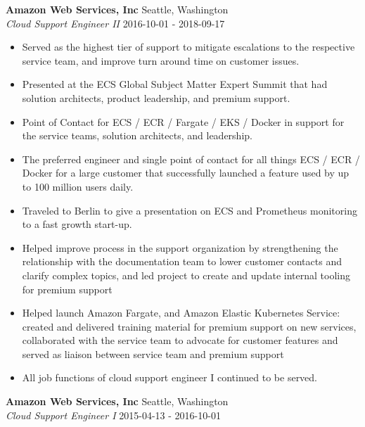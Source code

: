 \documentclass[a4paper]{article}
\begin{document}
\textbf{Amazon Web Services, Inc} \hfill Seattle, Washington\\
\textit{Cloud Support Engineer II} \hfill 2016-10-01 - 2018-09-17\\
\vspace{-1mm}
\begin{itemize} \itemsep 1pt
    \item Served as the highest tier of support to mitigate escalations to the respective service team, and improve turn around time on customer issues.
    \item Presented at the ECS Global Subject Matter Expert Summit that had solution architects, product leadership, and premium support.
    \item Point of Contact for ECS / ECR / Fargate / EKS / Docker in support for the service teams, solution architects, and leadership.
    \item The preferred engineer and single point of contact for all things ECS / ECR / Docker for a large customer that successfully launched a feature used by up to 100 million users daily.
    \item Traveled to Berlin to give a presentation on ECS and Prometheus monitoring to a fast growth start-up.
    \item Helped improve process in the support organization by strengthening the relationship with the documentation team to lower customer contacts and clarify complex topics, and led project to create and update internal tooling for premium support
    \item Helped launch Amazon Fargate, and Amazon Elastic Kubernetes Service: created and delivered training material for premium support on new services, collaborated with the service team to advocate for customer features and served as liaison between service team and premium support
    \item All job functions of cloud support engineer I continued to be served.
\end{itemize}
\textbf{Amazon Web Services, Inc} \hfill Seattle, Washington\\
\textit{Cloud Support Engineer I} \hfill 2015-04-13 - 2016-10-01\\
\vspace{-1mm}
\end{document}
